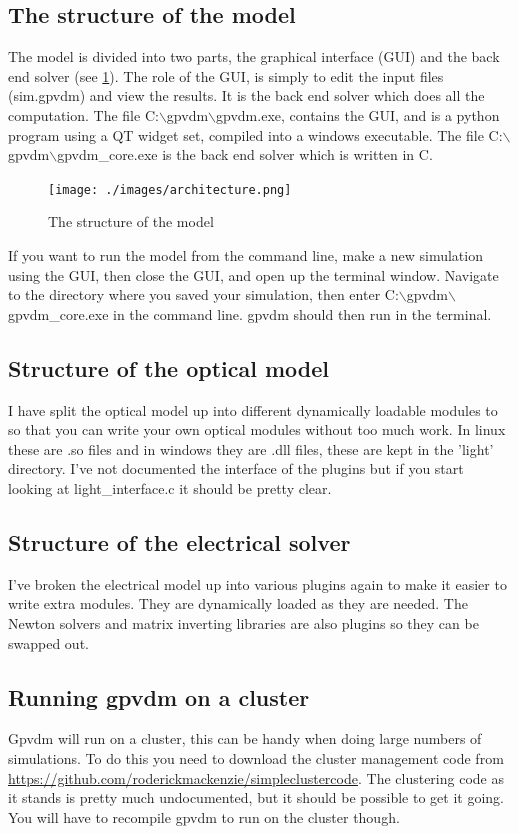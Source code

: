 \documentclass[11pt]{article}
\begin{document}
\subsection{The structure of the model}
The model is divided into two parts, the graphical interface (GUI) and the back end solver (see \ref{fig:structureofthemodel}).  The role of the GUI, is simply to edit the input files (sim.gpvdm) and view the results.  It is the back end solver which does all the computation.  The file C:$\backslash$gpvdm$\backslash$gpvdm.exe, contains the GUI, and is a python program using a QT widget set, compiled into a windows executable.  The file C:$\backslash$gpvdm$\backslash$gpvdm\_core.exe is the back end solver which is written in C.
\begin{figure}
\centering
\texttt{[image: ./images/architecture.png]}
\caption{The structure of the model}
\label{fig:structureofthemodel}
\end{figure}
If you want to run the model from the command line, make a new simulation using the GUI, then close the GUI, and open up the terminal window.  Navigate to the directory where you saved your simulation, then enter C:$\backslash$gpvdm$\backslash$gpvdm\_core.exe in the command line.  gpvdm should then run in the terminal.

\subsection{Structure of the optical model}
I have split the optical model up into different dynamically loadable modules to so that you can write your own optical modules without too much work.  In linux these are .so files and in windows they are .dll files, these are kept in the 'light' directory.  I've not documented the interface of the plugins but if you start looking at light\_interface.c it should be pretty clear.

\subsection{Structure of the electrical solver}
I've broken the electrical model up into various plugins again to make it easier to write extra modules.  They are dynamically loaded as they are needed.  The Newton solvers and matrix inverting libraries are also plugins so they can be swapped out.


\subsection{Running gpvdm on a cluster}
Gpvdm will run on a cluster, this can be handy when doing large numbers of simulations.  To do this you need to download the cluster management code from  \url{https://github.com/roderickmackenzie/simpleclustercode}.  The clustering code as it stands is pretty much undocumented, but it should be possible to get it going.  You will have to recompile gpvdm to run on the cluster though.
\end{document}
